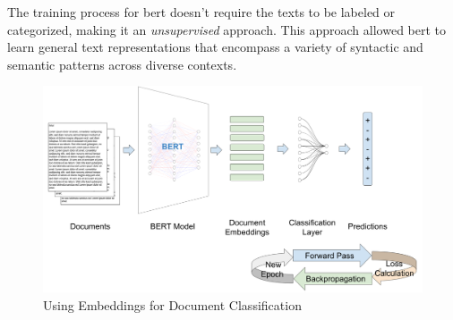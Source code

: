 \label{02_using_bert_for_text_classification}


The training process for \gls{bert} doesn't require the texts to be labeled or categorized, making it an \emph{unsupervised} approach. This approach allowed \gls{bert} to learn general text representations that encompass a variety of syntactic and semantic patterns across diverse contexts.



\begin{figure}
    \centering
    \includegraphics[width=\textwidth]{Figures/02/02_BERT_for_document_classification.png}
    \caption{Using \BERT{} Embeddings for Document Classification}
    \label{fig:02_bert_for_document_classification}
\end{figure}







